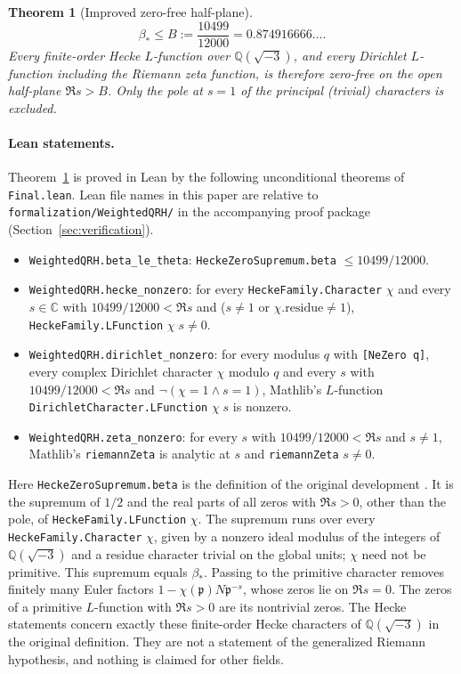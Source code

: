 \documentclass[11pt]{article}
\newtheorem{theorem}{Theorem}
\newcommand{\Bstar}{\beta_*}
\newcommand{\F}{\mathbb Q(\sqrt{-3})}
\begin{document}
\begin{theorem}[Improved zero-free half-plane]\label{thm:weighted-main}
\[
 \Bstar\le B:=\frac{10499}{12000}=0.874916666\ldots.
\]
Every finite-order Hecke $L$-function over $\F$, and every Dirichlet
$L$-function including the Riemann zeta function, is therefore zero-free
on the open half-plane $\Re s>B$. Only the pole at $s=1$ of the principal
(trivial) characters is excluded.
\end{theorem}

\paragraph{Lean statements.}
Theorem~\ref{thm:weighted-main} is proved in Lean by the following
unconditional theorems of \nolinkurl{Final.lean}. Lean file names in this
paper are relative to \nolinkurl{formalization/WeightedQRH/} in the
accompanying proof package (Section~\ref{sec:verification}).
\begingroup
\raggedright
\begin{itemize}
\item \nolinkurl{WeightedQRH.beta_le_theta}:
\nolinkurl{HeckeZeroSupremum.beta} $\le10499/12000$.
\item \nolinkurl{WeightedQRH.hecke_nonzero}: for every
\nolinkurl{HeckeFamily.Character} $\chi$ and every $s\in\mathbb C$ with
$10499/12000<\Re s$ and ($s\ne1$ or
$\chi.\mathrm{residue}\ne1$), \nolinkurl{HeckeFamily.LFunction}
$\chi\;s\ne0$.
\item \nolinkurl{WeightedQRH.dirichlet_nonzero}: for every modulus $q$
with \texttt{[NeZero q]}, every complex Dirichlet character $\chi$
modulo $q$ and every $s$ with $10499/12000<\Re s$ and
$\neg(\chi=1\wedge s=1)$, Mathlib's $L$-function
\nolinkurl{DirichletCharacter.LFunction} $\chi\;s$ is nonzero.
\item \nolinkurl{WeightedQRH.zeta_nonzero}: for every $s$ with
$10499/12000<\Re s$ and $s\ne1$, Mathlib's \nolinkurl{riemannZeta} is
analytic at $s$ and \nolinkurl{riemannZeta} $s\ne0$.
\end{itemize}
\endgroup
Here \nolinkurl{HeckeZeroSupremum.beta} is the definition of the original
development \cite{openai,fork}. It is the supremum of $1/2$ and the real
parts of all zeros with $\Re s>0$, other than the pole, of
\nolinkurl{HeckeFamily.LFunction} $\chi$. The supremum runs over every
\nolinkurl{HeckeFamily.Character} $\chi$, given by a nonzero ideal modulus
of the integers of $\F$ and a residue character trivial on the global
units; $\chi$ need not be primitive. This supremum equals $\Bstar$.
Passing to the primitive character removes finitely many Euler factors
$1-\chi(\mathfrak p)N\mathfrak p^{-s}$, whose zeros lie on $\Re s=0$.
The zeros of a primitive $L$-function with $\Re s>0$ are its nontrivial
zeros. The Hecke statements concern exactly these finite-order Hecke
characters of $\F$ in the original definition. They are not a statement
of the generalized Riemann hypothesis, and nothing is claimed for other
fields.
\end{document}

